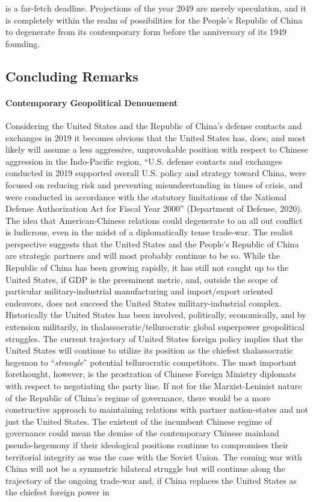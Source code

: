 \documentclass[12pt]{article}
\begin{document}
is a far-fetch deadline. Projections of the year 2049 are merely speculation, and it is completely within the realm of possibilities for the People's Republic of China to degenerate from its contemporary form before the  anniversary of its 1949 founding. 
 
\begin{center}
  \section{\normalsize Concluding Remarks}
\end{center}
\paragraph{Contemporary Geopolitical Denouement} Considering the United States and the Republic of China's defense contacts and exchanges in 2019 it becomes obvious that the United States has, does, and most likely will assume a less aggressive, unprovokable position with respect to Chinese aggression in the Indo-Pacific region, “U.S. defense contacts and exchanges conducted in 2019 supported overall U.S. policy and strategy toward China, were focused on reducing risk and preventing misunderstanding in times of crisis, and  were  conducted  in  accordance  with  the  statutory  limitations  of  the  National  Defense Authorization Act for Fiscal Year 2000” (Department of Defense, 2020). The idea that American-Chinese relations could degenerate to an all out conflict is ludicrous, even in the midst of a diplomatically tense trade-war. The realist perspective suggests that the United States and the People's Republic of China are strategic partners and will most probably continue to be so. While the Republic of China has been growing rapidly, it has still not caught up to the United States, if GDP is the preeminent metric, and, outside the scope of particular military-industrial manufacturing and import/export oriented endeavors, does not succeed the United States military-industrial complex. Historically the United States has been involved, politically, economically, and by extension militarily, in thalassocratic/tellurocratic global superpower geopolitical struggles. The current trajectory of United States foreign policy implies that the United States will continue to utilize its position as the chiefest thalassocratic hegemon to “\emph{strangle}” potential tellurocratic competitors. The most important forethought, however, is the prostration of Chinese Foreign Ministry diplomats with respect to negotiating the party line. If not for the Marxist-Leninist nature of the Republic of China's regime of governance, there would be a more constructive approach to maintaining relations with partner nation-states and not just the United States. The existent of the incumbent Chinese regime of governance could mean the demise of the contemporary Chinese mainland pseudo-hegemony if their ideological positions continue to compromises their territorial integrity as was the case with the Soviet Union. The coming war with China will not be a symmetric bilateral struggle but will continue along the trajectory of the ongoing trade-war and, if China replaces the United States as the chiefest foreign power in 
\end{document}
